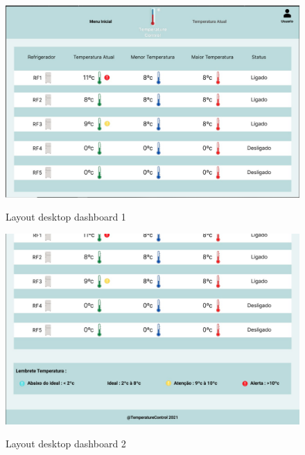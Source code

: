     \begin{figure}[ht]
        \caption{Layout desktop dashboard 1}
        \centering
        \includegraphics[scale=0.35]{img/desktop/dashboard_1.jpeg}
        \label{fig:desktopDashboard1}
    \end{figure}

    \begin{figure}[ht]
        \caption{Layout desktop dashboard 2}
        \centering
        \includegraphics[scale=0.35]{img/desktop/dashboard_2.jpeg}
        \label{fig:desktopDashboard2}
    \end{figure}


